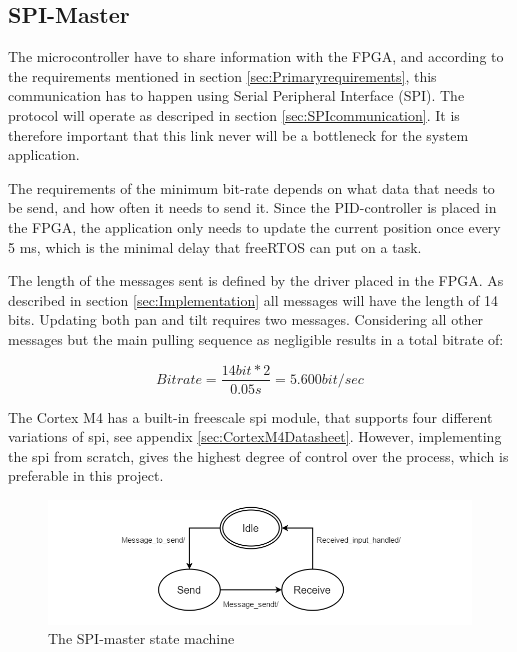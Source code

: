 \subsection{SPI-Master}
\label{sec:SPIMaster}

The microcontroller have to share information with the FPGA, and according to the requirements mentioned in section \ref{sec:Primaryrequirements}, this communication has to happen using Serial Peripheral Interface (SPI). The protocol will operate as descriped in section \ref{sec:SPIcommunication}. It is therefore important that this link never will be a bottleneck for the system application. 

The requirements of the minimum bit-rate depends on what data that needs to be send, and how often it needs to send it. Since the PID-controller is placed in the FPGA, the application only needs to update the current position once every 5 ms, which is the minimal delay that freeRTOS can put on a task. 

The length of the messages sent is defined by the driver placed in the FPGA. As described in section \ref{sec:Implementation} all messages will have the length of 14 bits. Updating both pan and tilt requires two messages. Considering all other messages but the main pulling sequence as negligible results in a total bitrate of:

\begin{equation}
Bitrate = \frac{
14 bit * 2	
}{
0.05s
} = 5.600 bit/sec 
\end{equation}

The Cortex M4 has a built-in freescale spi module, that supports four different variations of spi, see appendix \ref{sec:CortexM4Datasheet}. However, implementing the spi from scratch, gives the highest degree of control over the process, which is preferable in this project. 

\begin{figure}
	\centering
	\includegraphics[scale = 0.7] {Billeder/SPI-master}
	\caption{The SPI-master state machine}
	\label{fig:SPI-master}
\end{figure}

